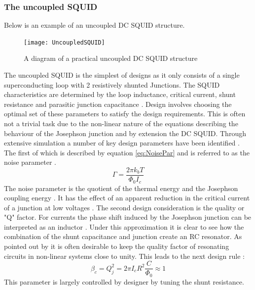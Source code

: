 \subsubsection*{The uncoupled SQUID}
Below is an example of an uncoupled DC SQUID structure. 
\begin{figure}[h]
    \centering
    \texttt{[image: UncoupledSQUID]}
    \caption{A diagram of a practical uncoupled DC SQUID structure \cite{DCSQUIDdesignImage}}
    \label{fig:UncoupledSQUID}
\end{figure}
The uncoupled SQUID is the simplest of designs as it only consists of a single superconducting loop with 2 resistively shunted Junctions. The SQUID characteristics are determined by the loop inductance, critical current, shunt resistance and parasitic junction capacitance \cite{Drung2016NBSQUIDS}. Design involves choosing the optimal set of these parameters to satisfy the design requirements. This is often not a trivial task due to the non-linear nature of the equations describing the behaviour of the Josephson junction and by extension the DC SQUID. Through extensive simulation a number of key design parameters have been identified \cite{Drung2016NBSQUIDS}. The first of which is described by equation \ref{eq:NoisePar} and is referred to as the noise parameter \cite{SQUIDhandbook}. 
\begin{equation}
    \Gamma = \frac{2\pi k_bT}{\Phi_0I_c}
    \label{eq:NoisePar}
\end{equation} 
The noise parameter is the quotient of the thermal energy and the Josephson coupling energy \cite{SQUIDhandbook}. It has the effect of an apparent reduction in the critical current of a junction at low voltages \cite{Drung2016NBSQUIDS}. \newline
The second design consideration is the quality or "Q" factor. For currents the phase shift induced by the Josephson junction can be interpreted as an inductor \cite{SQUIDhandbook}. Under this approximation it is clear to see how the combination of the shunt capacitance and junction create an RC resonator. As pointed out by \cite{Drung2016NBSQUIDS} it is often desirable to keep the quality factor of resonating circuits in non-linear systems close to unity. This leads to the next design rule \cite{SQUIDhandbook}:
\begin{equation}
    \beta_c = Q_j^2 = 2\pi I_cR^2\frac{C}{\Phi_0} \approx 1
    \label{eq:QFACT}
\end{equation}
This parameter is largely controlled by designer by tuning the shunt resistance.\newline
